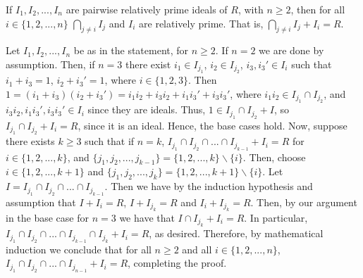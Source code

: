 \documentclass[12pt, a4paper, twoside, openright, titlepage]{book}
\begin{document}
\begin{lem}{}{}
    If $I_1, I_2,..., I_n$ are pairwise relatively prime ideals of $R$, with $n \geq 2$, then for all $i \in \{1,2,...,n\}$ $\bigcap_{j\neq i} I_j$ and $I_i$ are relatively prime. That is, $\bigcap_{j\neq i} I_j + I_i = R$.
    \begin{proof*}{}{}
        Let $I_1, I_2,..., I_n$ be as in the statement, for $n \geq 2$. If $n = 2$ we are done by assumption. Then, if $n = 3$ there exist $i_1 \in I_{j_1}$, $i_2 \in I_{j_2}$, $i_3,i_3' \in I_i$ such that $i_1+i_3 = 1$, $i_2+i_3' = 1$, where $i \in \{1,2,3\}$. Then $1 = (i_1+i_3)(i_2+i_3') = i_1i_2 + i_3i_2 + i_1i_3' + i_3i_3'$, where $i_1i_2 \in I_{j_1} \cap I_{j_2}$, and $i_3i_2,i_1i_3',i_3i_3' \in I_i$ since they are ideals. Thus, $1 \in I_{j_1}\cap I_{j_2} + I$, so $I_{j_1} \cap I_{j_2} + I_i = R$, since it is an ideal. Hence, the base cases hold. Now, suppose there exists $k \geq 3$ such that if $n = k$, $I_{j_1}\cap I_{j_2} \cap ... \cap I_{j_{k-1}} + I_i = R$ for $i \in \{1,2,...,k\}$, and $\{j_1,j_2,...,j_{k-1}\} = \{1,2,...,k\}\backslash\{i\}$. Then, choose $i \in \{1,2,...,k+1\}$ and $\{j_1,j_2,...,j_{k}\} = \{1,2,...,k+1\}\backslash\{i\}$. Let $I = I_{j_1}\cap I_{j_2} \cap ... \cap I_{j_{k-1}}$. Then we have by the induction hypothesis and assumption that $I + I_i = R$, $I + I_{j_k} = R$ and $I_i + I_{j_k} = R$. Then, by our argument in the base case for $n = 3$ we have that $I \cap I_{j_k} + I_i = R$. In particular, $I_{j_1}\cap I_{j_2} \cap ... \cap I_{j_{k-1}} \cap I_{j_k} + I_i = R$, as desired. Therefore, by mathematical induction we conclude that for all $n \geq 2$ and all $i \in \{1,2,...,n\}$, $I_{j_1}\cap I_{j_2} \cap ... \cap I_{j_{n-1}} + I_i = R$, completing the proof.
    \end{proof*}
    \label{genCRTLem}
\end{lem}
\end{document}
